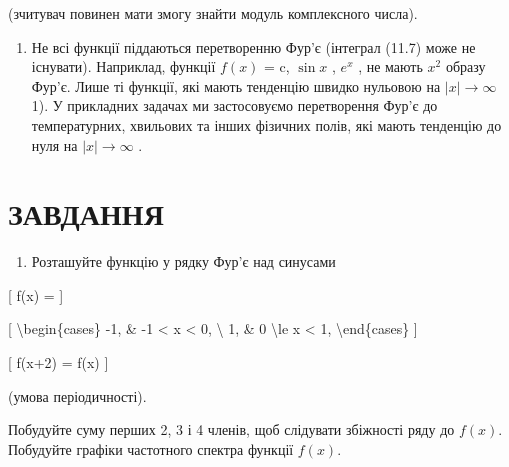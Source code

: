 \documentclass[
]{article}
\providecommand{\tightlist}{%
  \setlength{\itemsep}{0pt}\setlength{\parskip}{0pt}}
\begin{document}
(зчитувач повинен мати змогу знайти модуль комплексного числа).

\begin{enumerate}
\def\labelenumi{\arabic{enumi}.}
\setcounter{enumi}{2}
\tightlist
\item
  Не всі функції піддаються перетворенню Фур'є (інтеграл (11.7) може не
  існувати). Наприклад, функції \(f(x)\) = c, \(\sin x\) , \(e^x\) , не
  мають \(x^2\) образу Фур'є. Лише ті функції, які мають тенденцію
  швидко нульовою на \(|x| \to \infty\) 1). У прикладних задачах ми
  застосовуємо перетворення Фур'є до температурних, хвильових та інших
  фізичних полів, які мають тенденцію до нуля на \(|x| \to \infty\) .
\end{enumerate}

\section{ЗАВДАННЯ}\label{ux437ux430ux432ux434ux430ux43dux43dux44f-7}

\begin{enumerate}
\def\labelenumi{\arabic{enumi}.}
\tightlist
\item
  Розташуйте функцію у рядку Фур'є над синусами
\end{enumerate}

{[} f(x) = {]}

{[} \textbackslash begin\{cases\} -1, \& -1 \textless{} x \textless{} 0,
\textbackslash{} 1, \& 0 \textbackslash le x \textless{} 1,
\textbackslash end\{cases\} {]}

{[} f(x+2) = f(x) {]}

(умова періодичності).

Побудуйте суму перших 2, 3 і 4 членів, щоб слідувати збіжності ряду до
\(f(x)\). Побудуйте графіки частотного спектра функції \(f(x)\).
\end{document}
